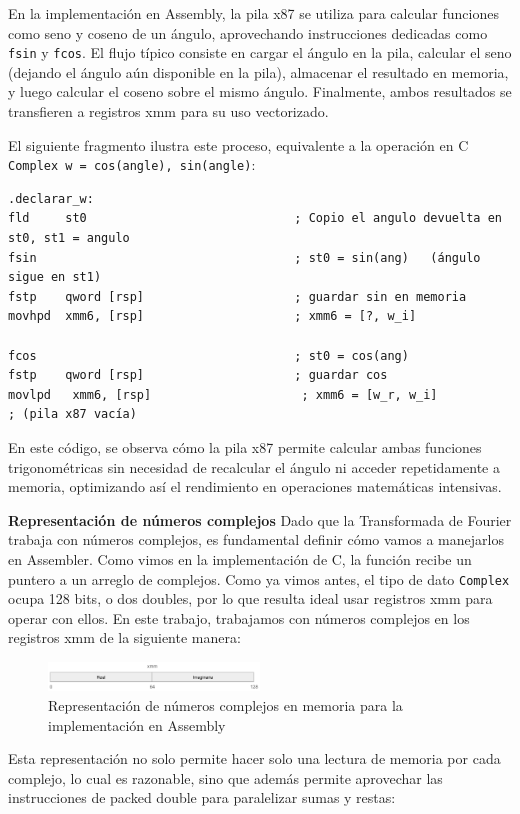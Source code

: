 \documentclass[a4paper]{article}
\begin{document}
En la implementación en Assembly, la pila x87 se utiliza para calcular funciones como seno y coseno de un ángulo, aprovechando instrucciones dedicadas como
\texttt{fsin} y \texttt{fcos}. El flujo típico consiste en cargar el ángulo en la pila, calcular el seno (dejando el ángulo aún disponible en la pila), almacenar
el resultado en memoria, y luego calcular el coseno sobre el mismo ángulo. Finalmente, ambos resultados se transfieren a registros xmm para su uso vectorizado.

El siguiente fragmento ilustra este proceso, equivalente a la operación en C \texttt{Complex w = {cos(angle), sin(angle)}}:
\begin{verbatim}
.declarar_w:
fld     st0                             ; Copio el angulo devuelta en st0, st1 = angulo
fsin                                    ; st0 = sin(ang)   (ángulo sigue en st1)
fstp    qword [rsp]                     ; guardar sin en memoria
movhpd  xmm6, [rsp]                     ; xmm6 = [?, w_i]

fcos                                    ; st0 = cos(ang)
fstp    qword [rsp]                     ; guardar cos
movlpd   xmm6, [rsp]                     ; xmm6 = [w_r, w_i]
; (pila x87 vacía)
\end{verbatim}
En este código, se observa cómo la pila x87 permite calcular ambas funciones trigonométricas sin necesidad de recalcular el ángulo ni acceder repetidamente a memoria, optimizando así el rendimiento en operaciones matemáticas intensivas.


\textbf{Representación de números complejos}
Dado que la Transformada de Fourier trabaja con números complejos, es fundamental definir cómo vamos a manejarlos en Assembler. Como vimos en la implementación de C, la función recibe un puntero a un arreglo de complejos. Como ya vimos antes, el tipo de dato \texttt{Complex} ocupa 128 bits, o dos doubles, por lo que resulta ideal usar registros xmm para operar con ellos. En este trabajo, trabajamos con números complejos en los registros xmm de la siguiente manera:

\begin{figure}[h]
    \centering
    \includegraphics[width=0.5\textwidth]{extra/xmm complex.png}
    \caption{Representación de números complejos en memoria para la implementación en Assembly}
    \label{fig:asm_complex_representation}
\end{figure}
Esta representación no solo permite hacer solo una lectura de memoria por cada complejo, lo cual es razonable, sino que además permite aprovechar las instrucciones de packed double para paralelizar sumas y restas:
\end{document}
